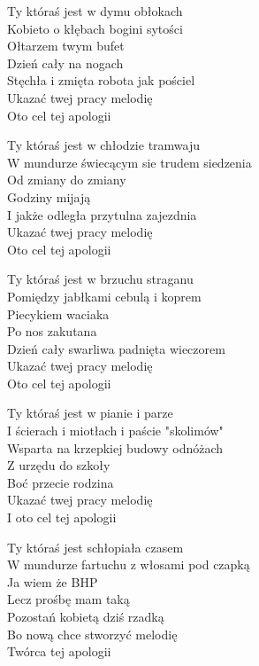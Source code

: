 
\begin{text}
    Ty któraś jest w dymu obłokach\\
    Kobieto o kłębach bogini sytości\\
    Ołtarzem twym bufet\\
    Dzień cały na nogach\\
    Stęchła i zmięta robota jak pościel\\
    Ukazać twej pracy melodię\\
    Oto cel tej apologii

    Ty któraś jest w chłodzie tramwaju\\
    W mundurze świecącym sie trudem siedzenia\\
    Od zmiany do zmiany\\
    Godziny mijają\\
    I jakże odległa przytulna zajezdnia\\
    Ukazać twej pracy melodię\\
    Oto cel tej apologii

    Ty któraś jest w brzuchu straganu\\
    Pomiędzy jabłkami cebulą i koprem\\
    Piecykiem waciaka\\
    Po nos zakutana\\
    Dzień cały swarliwa padnięta wieczorem\\
    Ukazać twej pracy melodię\\
    Oto cel tej apologii

    Ty któraś jest w pianie i parze\\
    I ścierach i miotłach i paście "skolimów"\\
    Wsparta na krzepkiej budowy odnóżach\\
    Z urzędu do szkoły\\
    Boć przecie rodzina\\
    Ukazać twej pracy melodię\\
    I oto cel tej apologii

    Ty któraś jest schłopiała czasem\\
    W mundurze fartuchu z włosami pod czapką\\
    Ja wiem że BHP\\
    Lecz prośbę mam taką\\
    Pozostań kobietą dziś rzadką\\
    Bo nową chce stworzyć melodię\\
    Twórca tej apologii
\end{text}
\begin{chord}

\end{chord}